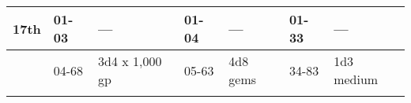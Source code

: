 \begin{longtable}{llllllllllllll}
\hline
\multicolumn{8}{p{1.150in}|}{\begin{minipage}[t]{1.150in}\centering
17th\end{minipage}} & \multicolumn{1}{|p{0.393in}|}{\begin{minipage}[t]{0.393in}\raggedright
01-03\end{minipage}} & \multicolumn{1}{p{0.469in}|}{\begin{minipage}[t]{0.469in}\raggedright
---\end{minipage}} & \multicolumn{1}{p{0.923in}|}{\begin{minipage}[t]{0.923in}\raggedright
01-04\end{minipage}} & \multicolumn{1}{p{0.469in}|}{\begin{minipage}[t]{0.469in}\raggedright
---\end{minipage}} & \multicolumn{1}{p{0.626in}|}{\begin{minipage}[t]{0.626in}\raggedright
01-33\end{minipage}} & \multicolumn{1}{p{0.469in}|}{\begin{minipage}[t]{0.469in}\centering
---\end{minipage}}\\
\hline
\multicolumn{8}{p{1.150in}|}{\begin{minipage}[t]{1.150in}\centering
\end{minipage}} & \multicolumn{1}{|p{0.393in}|}{\begin{minipage}[t]{0.393in}\raggedright
04-68\end{minipage}} & \multicolumn{1}{p{0.469in}|}{\begin{minipage}[t]{0.469in}\raggedright
3d4 x 1,000 gp\end{minipage}} & \multicolumn{1}{p{0.923in}|}{\begin{minipage}[t]{0.923in}\raggedright
05-63\end{minipage}} & \multicolumn{1}{p{0.469in}|}{\begin{minipage}[t]{0.469in}\raggedright
4d8 gems\end{minipage}} & \multicolumn{1}{p{0.626in}|}{\begin{minipage}[t]{0.626in}\raggedright
34-83\end{minipage}} & \multicolumn{1}{p{0.469in}|}{\begin{minipage}[t]{0.469in}\centering
1d3 medium\end{minipage}}\\
\hline
\multicolumn{8}{p{1.150in}|}{\begin{minipage}[t]{1.150in}\centering

\end{minipage}}
\end{longtable}
